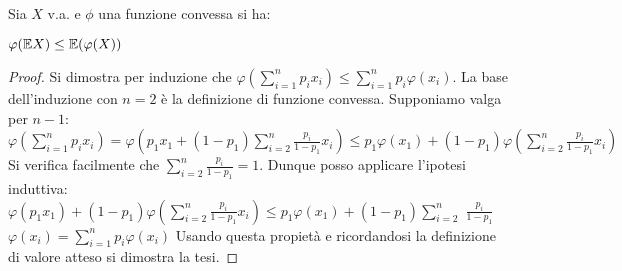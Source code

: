 \begin{proposition}
Sia $X$ v.a. e $\phi$ una funzione convessa si ha:
\begin{center}
    $\varphi(\mathbb{E} X)\leq\mathbb{E}(\varphi(X))$
\end{center}
\vspace{5px}
\begin{proof}
Si dimostra per induzione che $\varphi(\sum\limits_{i=1}^np_ix_i)\leq\sum\limits_{i=1}^np_i\varphi(x_i)$.
\newline
La base dell'induzione con $n=2$ è la definizione di funzione convessa.
\newline
Supponiamo valga per $n-1$:
\vspace{5px}
\newline
$\varphi(\sum\limits_{i=1}^np_ix_i)=\varphi(p_1x_1+(1-p_1)\sum\limits_{i=2}^n\frac{p_i}{1-p_1}x_i)\leq p_1\varphi(x_1)+(1-p_1)\varphi(\sum\limits_{i=2}^n\frac{p_i}{1-p_1}x_i)$
\vspace{5px}
\newline
Si verifica facilmente che $\sum\limits_{i=2}^n${\large$\frac{p_i}{1-p_1}$}$=1$. Dunque posso applicare l'ipotesi induttiva:
\vspace{5px}
\newline
$\varphi(p_1x_1)+(1-p_1)\varphi(\sum\limits_{i=2}^n\frac{p_i}{1-p_1}x_i)\leq p_1\varphi(x_1)+(1-p_1)\sum\limits_{i=2}^n$ {\large$\frac{p_i}{1-p_1}$} $\varphi(x_i)=\sum\limits_{i=1}^np_i\varphi(x_i)$
\vspace{5px}
\newline
Usando questa propietà e ricordandosi la definizione di valore atteso si dimostra la tesi.
\end{proof}
\end{proposition}

\vspace{10px}

